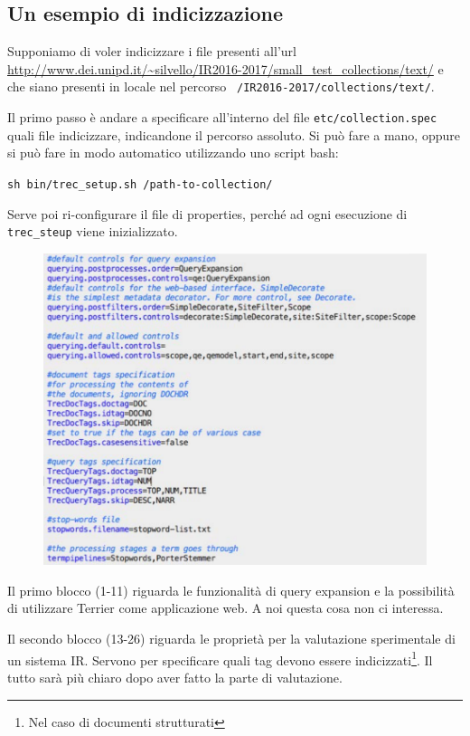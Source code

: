 \subsection{Un esempio di indicizzazione}

Supponiamo di voler indicizzare i file presenti all'url \url{http://www.dei.unipd.it/~silvello/IR2016-2017/small_test_collections/text/} e che siano presenti in locale nel percorso \texttt{ /IR2016-2017/collections/text/}.

Il primo passo è andare a specificare all'interno del file \texttt{etc/collection.spec} quali file indicizzare, indicandone il percorso assoluto.
Si può fare a mano, oppure si può fare in modo automatico utilizzando uno script bash:

\begin{center}
	\texttt{sh bin/trec\_setup.sh /path-to-collection/}
\end{center}

\noindent Serve poi ri-configurare il file di properties, perché ad ogni esecuzione di \texttt{trec\_steup} viene inizializzato.

\begin{figure}[htbp]
	\centering
	\includegraphics[width=0.8\linewidth]{images/l12-fig-2.png}
\end{figure}

\noindent Il primo blocco (1-11) riguarda le funzionalità di query expansion e la possibilità di utilizzare Terrier come applicazione web. A noi questa cosa non ci interessa.

Il secondo blocco (13-26) riguarda le proprietà per la valutazione sperimentale di un sistema IR. Servono per specificare quali tag devono essere indicizzati\footnote{Nel caso di documenti strutturati}. Il tutto sarà più chiaro dopo aver fatto la parte di valutazione.

